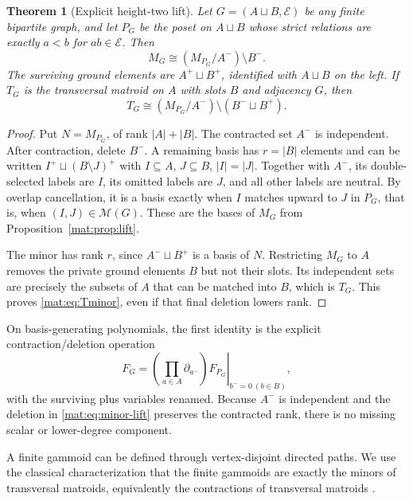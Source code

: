 \documentclass[11pt]{article}
\numberwithin{equation}{section}
\newtheorem{theorem}{Theorem}[section]
\theoremstyle{definition}
\newcommand{\PM}{\mathcal M}
\begin{document}
\begin{theorem}[Explicit height-two lift]\label{mat:thm:minor}
Let $G=(A\sqcup B,\mathcal E)$ be any finite bipartite graph, and let
$P_G$ be the poset on $A\sqcup B$ whose strict relations are exactly
$a<b$ for $ab\in\mathcal E$. Then
\begin{equation}
 M_G\cong (M_{P_G}/A^-)\setminus B^-.
\label{mat:eq:minor-lift}
\end{equation}
The surviving ground elements are $A^+\sqcup B^+$, identified with
$A\sqcup B$ on the left. If $T_G$ is the transversal matroid on $A$
with slots $B$ and adjacency $G$, then
\begin{equation}
 T_G\cong (M_{P_G}/A^-)\setminus(B^-\sqcup B^+).
\label{mat:eq:Tminor}
\end{equation}
\end{theorem}
\begin{proof}
Put $N=M_{P_G}$, of rank $|A|+|B|$. The contracted set $A^-$ is independent.
After contraction, delete $B^-$. A remaining basis has $r=|B|$ elements and
can be written $I^+\sqcup(B\setminus J)^+$ with $I\subseteq A$,
$J\subseteq B$, $|I|=|J|$. Together with $A^-$, its double-selected labels
are $I$, its omitted labels are $J$, and all other labels are neutral.
By overlap cancellation, it is a basis exactly when $I$ matches upward to
$J$ in $P_G$, that is, when $(I,J)\in\PM(G)$. These are the bases of
$M_G$ from Proposition~\ref{mat:prop:lift}.

The minor has rank $r$, since $A^-\sqcup B^+$ is a basis of $N$.
Restricting $M_G$ to $A$ removes the private ground elements $B$ but not
their slots. Its independent sets are precisely the subsets of $A$ that
can be matched into $B$, which is $T_G$. This proves
\eqref{mat:eq:Tminor}, even if that final deletion lowers rank.
\end{proof}

On basis-generating polynomials, the first identity is the explicit
contraction/deletion operation
\begin{equation}
 F_G=\left.
 \left(\prod_{a\in A}\partial_{a^-}\right)F_{P_G}
 \right|_{b^-=0\ (b\in B)},
\label{mat:eq:minor-poly}
\end{equation}
with the surviving plus variables renamed. Because $A^-$ is independent
and the deletion in \eqref{mat:eq:minor-lift} preserves the contracted rank,
there is no missing scalar or lower-degree component.

A finite gammoid can be defined through vertex-disjoint directed paths.
We use the classical characterization that the finite gammoids are exactly
the minors of transversal matroids, equivalently the contractions of
transversal matroids \cite{IP}.
\end{document}
